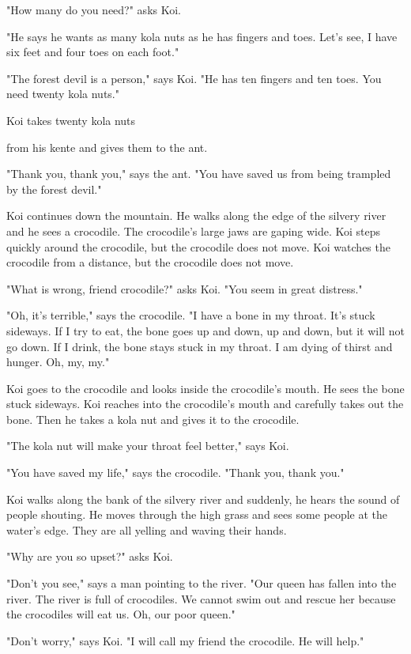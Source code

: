 "How many do you need?" asks Koi.

"He says he wants as many kola nuts as he has fingers and toes. Let's see, I have six feet and four toes on each foot."

"The forest devil is a person," says Koi. "He has ten fingers and ten toes. You need twenty kola nuts."

Koi takes twenty kola nuts

from his kente and gives them to the ant.

"Thank you, thank you," says the ant. "You have saved us from being trampled by the forest devil."

Koi continues down the mountain. He walks along the edge of the silvery river and he sees a crocodile. The crocodile's large jaws are gaping wide. Koi steps quickly around the crocodile, but the crocodile does not move. Koi watches the crocodile from a distance, but the crocodile does not move.

"What is wrong, friend crocodile?" asks Koi. "You seem in great distress."

"Oh, it's terrible," says the crocodile. "I have a bone in my throat. It's stuck sideways. If I try to eat, the bone goes up and down, up and down, but it will not go down. If I drink, the bone stays stuck in my throat. I am dying of thirst and hunger. Oh, my, my."

Koi goes to the crocodile and looks inside the crocodile's mouth. He sees the bone stuck sideways. Koi reaches into the crocodile's mouth and carefully takes out the bone. Then he takes a kola nut and gives it to the crocodile.

"The kola nut will make your throat feel better," says Koi.

"You have saved my life," says the crocodile. "Thank you, thank you."

Koi walks along the bank of the silvery river and suddenly, he hears the sound of people shouting. He moves through the high grass and sees some people at the water's edge. They are all yelling and waving their hands.

"Why are you so upset?" asks Koi.

"Don't you see," says a man pointing to the river. "Our queen has fallen into the river. The river is full of crocodiles. We cannot swim out and rescue her because the crocodiles will eat us. Oh, our poor queen."

"Don't worry," says Koi. "I will call my friend the crocodile. He will help."


